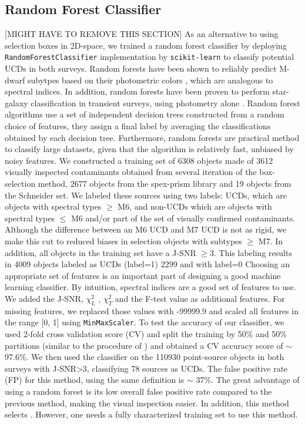 \documentclass[manuscript]{aastex63}
\begin{document}
\subsection{Random Forest Classifier}
[MIGHT HAVE TO REMOVE THIS SECTION]
As an alternative to using selection boxes in 2D-space, we trained a random forest classifier by deploying \texttt{RandomForestClassifier} implementation by \texttt{scikit-learn} \citep{2012arXiv1201.0490P} to classify potential UCDs in both surveys. Random forests have been shown to reliably predict M-dwarf subytpes based on their photometric colors \citep{2019arXiv190505900H}, which are analogous to spectral indices. In addition, random forests have been proven to perform star-galaxy classification in transient surveys, using photometry alone \citep{2017AJ....153...73M}. Random forest algorithms use a set of independent decision trees constructed from a random choice of features, they assign a final label by averaging the classifications obtained by each decision tree. Furthermore, random forests are practical method to classify large datasets, given that the algorithm is relatively fast, unbiased by noisy features.
 We constructed a training set of 6308 objects made of 3612 visually inspected contaminants obtained from several iteration of the box-selection method, 2677 objects from the spex-prism library and 19 objects from the Schneider set. We labeled these sources using two labels: UCDs, which are objects with spectral types $\geq$ M6, and non-UCDs which are objects with spectral types $\leq$ M6 and/or part of the set of visually confirmed contaminants. Although the difference between an M6 UCD and M7 UCD is not as rigid, we make this cut to reduced biases in selection objects with subtypes $\geq$ M7. In addition, all objects in the training set have a J-SNR $\geq$3. This labeling results in  4009 objects labeled as UCDs (label=1) 2299 and with label=0
Choosing an appropriate set of features is an important part of designing a good machine learning classifier. By intuition, spectral indices are a good set of features to use. We added the J-SNR, $\chi^2 _L$ , $\chi^2 _T$ and the F-test value as additional features. For missing features, we replaced those values with -99999.9 and scaled all features in the range [0, 1] using \texttt{MinMaxScaler}. To test the accuracy of our classifier, we used 2-fold cross validation score (CV) and split the training by 50\% and 50\% partitions (similar to the procedure of \citealt{2017AJ....153...73M}) and obtained a CV accuracy score of $\sim$ 97.6\%. We then used the classifier on the 110930 point-source objects in both surveys with J-SNR\textgreater 3, classifying 78 sources as UCDs. The false positive rate (FP) for this method, using the same definition is $\sim$ 37\%. The great advantage of using a random forest is its low overall false positive rate compared to the previous method, making the visual inspection easier. In addition, this method selects . However, one needs a fully characterized training set to use this method.
\end{document}
